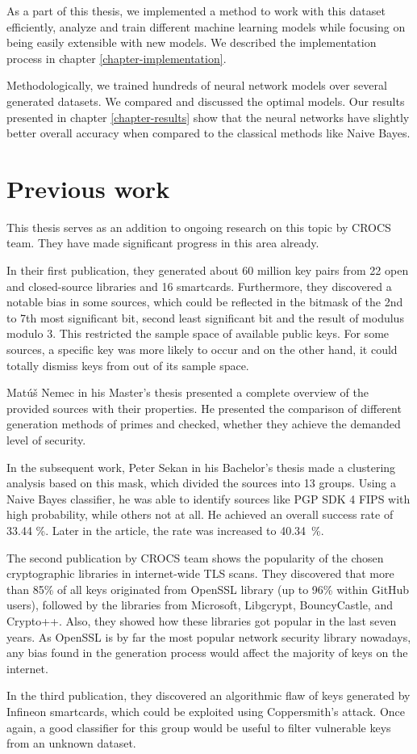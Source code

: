As a part of this thesis, we implemented a method to work with this dataset efficiently, analyze and train different machine learning models while focusing on being easily extensible with new models. We described the implementation process in chapter \ref{chapter-implementation}.

Methodologically, we trained hundreds of neural network models over several generated datasets. We compared and discussed the optimal models. Our results presented in chapter \ref{chapter-results} show that the neural networks have slightly better overall accuracy when compared to the classical methods like Naive Bayes.

\section{Previous work}
\label{chapter-prev-work}

This thesis serves as an addition to ongoing research on this topic by CROCS team. They have made significant progress in this area already. 

In their first publication\cite{svenda_1}, they generated about 60 million key pairs from 22 open and closed-source libraries and 16 smartcards. Furthermore, they discovered a notable bias in some sources, which could be reflected in the bitmask of the 2nd to 7th most significant bit, second least significant bit and the result of modulus modulo 3. This restricted the sample space of available public keys. For some sources, a specific key was more likely to occur and on the other hand, it could totally dismiss keys from out of its sample space.

Mat\'{u}š Nemec in his Master's thesis\cite{thesis_matus_nemec} presented a complete overview of the provided sources with their properties. He presented the comparison of different generation methods of primes and checked, whether they achieve the demanded level of security.

In the subsequent work, Peter Sekan in his Bachelor's thesis\cite{thesis_sekan} made a clustering analysis based on this mask, which divided the sources into 13 groups. Using a Naive Bayes classifier, he was able to identify sources like PGP SDK 4 FIPS with high probability, while others not at all. He achieved an overall success rate of 33.44 \%. Later in the article\cite{svenda_1}, the rate was increased to 40.34~\%.

The second publication by CROCS team\cite{svenda_3} shows the popularity of the chosen cryptographic libraries in internet-wide TLS scans. They discovered that more than 85\% of all keys originated from OpenSSL library (up to 96\% within GitHub users), followed by the libraries from Microsoft, Libgcrypt, BouncyCastle, and Crypto++. Also, they showed how these libraries got popular in the last seven years. As OpenSSL is by far the most popular network security library nowadays, any bias found in the generation process would affect the majority of keys on the internet.

In the third publication\cite{svenda_2}, they discovered an algorithmic flaw of keys generated by Infineon smartcards, which could be exploited using Coppersmith's attack. Once again, a good classifier for this group would be useful to filter vulnerable keys from an unknown dataset.

